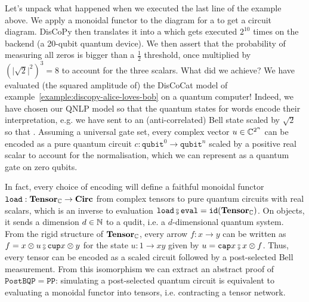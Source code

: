 Let's unpack what happened when we executed the last line of the example above.
We apply a monoidal functor  to the diagram for a  to get a circuit diagram.
DisCoPy then translates it into a  which gets executed $2^{10}$ times on the  backend (a 20-qubit quantum device).
We then assert that the probability of measuring all zeros is bigger than a $\frac{1}{2}$ threshold, once multiplied by $(\vert \sqrt{2} \vert^2)^3 = 8$ to account for the three scalars.
What did we achieve?
We have evaluated (the squared amplitude of) the DisCoCat model of example~\ref{example:discopy-alice-loves-bob} on a quantum computer!
Indeed, we have chosen our QNLP model so that the quantum states for words encode their interpretation, e.g. we have sent  to an (anti-correlated) Bell state scaled by $\sqrt{2}$ so that  \py{= [[0, 1], [1, 0]]}.
Assuming a universal gate set, every complex vector $u \in \mathbb{C}^{2^n}$ can be encoded as a pure quantum circuit $c : \mathtt{qubit}^0 \to \mathtt{qubit}^n$ scaled by a positive real scalar to account for the normalisation, which we can represent as a quantum gate on zero qubits.

In fact, every choice of encoding will define a faithful monoidal functor $\mathtt{load} : \mathbf{Tensor}_{\mathbb{C}} \to \mathbf{Circ}$ from complex tensors to pure quantum circuits with real scalars, which is an inverse to evaluation $\mathtt{load} \fcmp \mathtt{eval} = \id(\mathbf{Tensor}_\C)$.
On objects, it sends a dimension $d \in \mathbb{N}$ to a qudit, i.e. a $d$-dimensional quantum system.
From the rigid structure of $\mathbf{Tensor}_{\mathbb{C}}$, every arrow $f : x \to y$ can be written as $f = x \otimes u \fcmp \ttcup{x} \otimes y$ for the state $u : 1 \to x y$ given by $u = \ttcap{x} \fcmp x \otimes f$.
Thus, every tensor can be encoded as a scaled circuit followed by a post-selected Bell measurement.
From this isomorphism we can extract an abstract proof of $\mathtt{PostBQP} = \mathtt{PP}$: simulating a post-selected quantum circuit is equivalent to evaluating a monoidal functor into tensors, i.e. contracting a tensor network.

